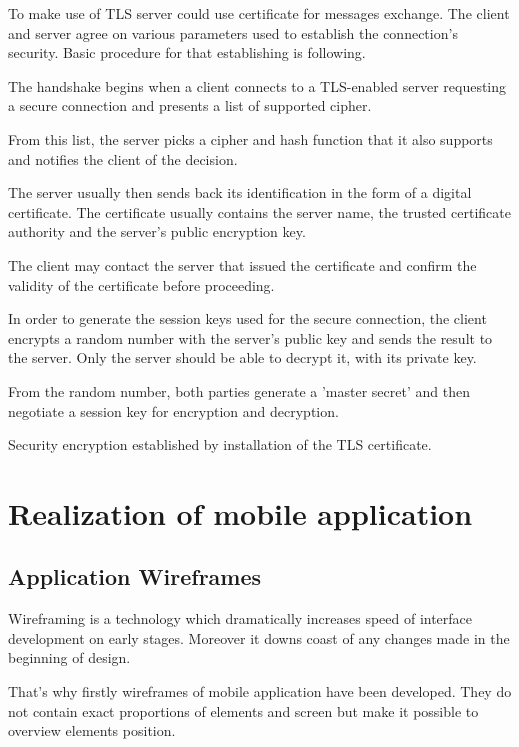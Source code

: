 \documentclass[thesis=M,english]{FITthesis}[2012/10/20]
\begin{document}
To make use of TLS server could use certificate for messages exchange.  The client and server agree on various parameters used to establish the connection's security. Basic procedure for that establishing is following.

The handshake begins when a client connects to a TLS-enabled server requesting a secure connection and presents a list of supported cipher.

From this list, the server picks a cipher and hash function that it also supports and notifies the client of the decision.

The server usually then sends back its identification in the form of a digital certificate. The certificate usually contains the server name, the trusted certificate authority and the server's public encryption key.

The client may contact the server that issued the certificate and confirm the validity of the certificate before proceeding.

In order to generate the session keys used for the secure connection, the client encrypts a random number with the server's public key and sends the result to the server. Only the server should be able to decrypt it, with its private key.

From the random number, both parties generate a 'master secret' and then negotiate a session key for encryption and decryption.

Security encryption established by installation of the TLS certificate.



\chapter{Realization of mobile application}

\section{Application Wireframes}

Wireframing is a technology which dramatically increases speed of interface development on early stages. Moreover it downs coast of any changes made in the beginning of design.

That's why firstly wireframes of mobile application have been developed. They do not contain exact proportions of elements and screen but make it possible to overview elements position.

\clearpage
\end{document}
